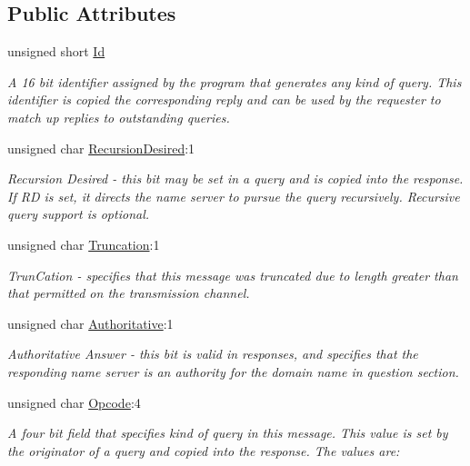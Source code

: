 \subsection*{Public Attributes}
\begin{DoxyCompactItemize}
\item 
unsigned short \hyperlink{struct_senergy_1_1_dns_1_1_message_header_fields_ab423a1e91fecd6ad2ec36a4bdafd5c2b}{Id}
\begin{DoxyCompactList}\small\item\em A 16 bit identifier assigned by the program that generates any kind of query. This identifier is copied the corresponding reply and can be used by the requester to match up replies to outstanding queries. \end{DoxyCompactList}\item 
unsigned char \hyperlink{struct_senergy_1_1_dns_1_1_message_header_fields_ab5d7c8933016bb7288462b4a0ac131a5}{Recursion\-Desired}\-:1
\begin{DoxyCompactList}\small\item\em Recursion Desired -\/ this bit may be set in a query and is copied into the response. If R\-D is set, it directs the name server to pursue the query recursively. Recursive query support is optional. \end{DoxyCompactList}\item 
unsigned char \hyperlink{struct_senergy_1_1_dns_1_1_message_header_fields_a15d1ee99bf788c080001c3216c88274c}{Truncation}\-:1
\begin{DoxyCompactList}\small\item\em Trun\-Cation -\/ specifies that this message was truncated due to length greater than that permitted on the transmission channel. \end{DoxyCompactList}\item 
unsigned char \hyperlink{struct_senergy_1_1_dns_1_1_message_header_fields_a706fe34b459a6aaacc28f0249213b013}{Authoritative}\-:1
\begin{DoxyCompactList}\small\item\em Authoritative Answer -\/ this bit is valid in responses, and specifies that the responding name server is an authority for the domain name in question section. \end{DoxyCompactList}\item 
unsigned char \hyperlink{struct_senergy_1_1_dns_1_1_message_header_fields_ac2d7ba4468405e5693f07d4321058be0}{Opcode}\-:4
\begin{DoxyCompactList}\small\item\em A four bit field that specifies kind of query in this message. This value is set by the originator of a query and copied into the response. The values are\-: \end{DoxyCompactList}\item 

\end{DoxyCompactItemize}
